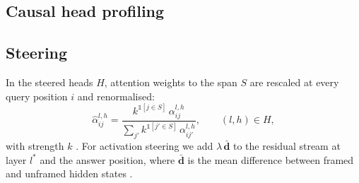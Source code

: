 \subsection{Causal head profiling}
\label{sec:method:profiling}

\subsection{Steering}
\label{sec:method:steering}
In the steered heads $H$, attention weights to the span $S$ are rescaled at every
query position $i$ and renormalised:
\begin{equation}
  \hat\alpha^{l,h}_{ij} = \frac{k^{\mathbb 1[j\in S]}\,\alpha^{l,h}_{ij}}
                               {\sum_{j'} k^{\mathbb 1[j'\in S]}\,\alpha^{l,h}_{ij'}},
  \qquad (l,h)\in H,
  \label{eq:pasta}
\end{equation}
with strength $k$ \citep{zhang2024pasta}. For activation steering we add
$\lambda\,\bar{\bm d}$ to the residual stream at layer $l^\ast$ and the answer position, where
$\bar{\bm d}$ is the mean difference between framed and unframed hidden states
\citep{turner2023activation}.


